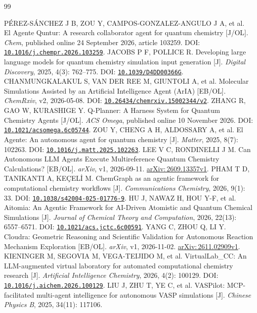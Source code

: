 \documentclass[a4paper,11pt]{article}
\newcommand{\doi}[1]{\href{https://doi.org/#1}{\nolinkurl{#1}}}
\newcommand{\ax}[1]{\href{https://arxiv.org/abs/#1}{arXiv:\,#1}}
\begin{document}
\begingroup
\small
\begin{thebibliography}{99}
\raggedright
\setlength{\itemsep}{.35em plus .1em}
  PÉREZ-SÁNCHEZ J B, ZOU Y, CAMPOS-GONZALEZ-ANGULO J A, et al.
  El Agente Quntur: A research collaborator agent for quantum chemistry [J/OL].
  \emph{Chem}, published online 24 September 2026, article 103259.
  DOI: \doi{10.1016/j.chempr.2026.103259}.
  JACOBS P F, POLLICE R.
  Developing large language models for quantum chemistry simulation input generation [J].
  \emph{Digital Discovery}, 2025, 4(3): 762--775.
  DOI: \doi{10.1039/D4DD00366G}.
  CHANMUNGKALAKUL S, VAN DER REE M, GIUNTOLI A, et al.
  Molecular Simulations Assisted by an Artificial Intelligence Agent (ArIA) [EB/OL].
  \emph{ChemRxiv}, v2, 2026-05-08.
  DOI: \doi{10.26434/chemrxiv.15002344/v2}.
  ZHANG R, GAO W, KURASHIGE Y.
  Q-Planner: A Harness System for Quantum Chemistry Agents [J/OL].
  \emph{ACS Omega}, published online 10 November 2026.
  DOI: \doi{10.1021/acsomega.6c05744}.
  ZOU Y, CHENG A H, ALDOSSARY A, et al.
  El Agente: An autonomous agent for quantum chemistry [J].
  \emph{Matter}, 2025, 8(7): 102263.
  DOI: \doi{10.1016/j.matt.2025.102263}.
  LEE V C, RONDINELLI J M.
  Can Autonomous LLM Agents Execute Multireference Quantum Chemistry Calculations?
  [EB/OL].
  \emph{arXiv}, v1, 2026-09-11.
  \ax{2609.13357v1}.
  PHAM T D, TANIKANTI A, KEÇELİ M.
  ChemGraph as an agentic framework for computational chemistry workflows [J].
  \emph{Communications Chemistry}, 2026, 9(1): 33.
  DOI: \doi{10.1038/s42004-025-01776-9}.
  HU J, NAWAZ H, HOU Y-F, et al.
  Aitomia: An Agentic Framework for AI-Driven Atomistic and Quantum Chemical Simulations
  [J].
  \emph{Journal of Chemical Theory and Computation}, 2026, 22(13): 6557--6571.
  DOI: \doi{10.1021/acs.jctc.6c00591}.
  YANG C, ZHOU Q, LI Y.
  Cloudra: Geometric Reasoning and Scientific Validation for Autonomous Reaction Mechanism
  Exploration [EB/OL].
  \emph{arXiv}, v1, 2026-11-02.
  \ax{2611.02909v1}.
  KIENINGER M, SEGOVIA M, VEGA-TEIJIDO M, et al.
  VirtualLab\_CC: An LLM-augmented virtual laboratory for automated computational
  chemistry research [J].
  \emph{Artificial Intelligence Chemistry}, 2026, 4(2): 100129.
  DOI: \doi{10.1016/j.aichem.2026.100129}.
  LIU J, ZHU T, YE C, et al.
  VASPilot: MCP-facilitated multi-agent intelligence for autonomous VASP simulations [J].
  \emph{Chinese Physics B}, 2025, 34(11): 117106.

\end{thebibliography}
\end{document}
